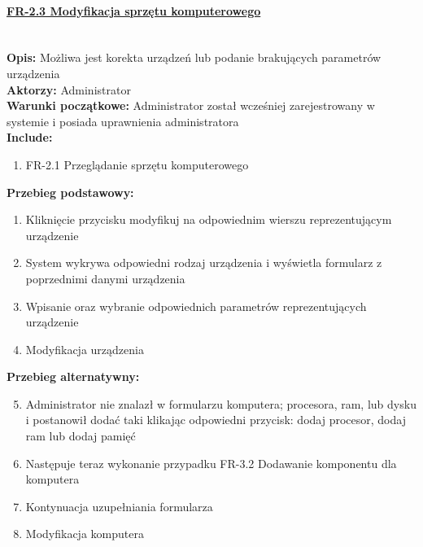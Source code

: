 \paragraph{\underline{FR-2.3 Modyfikacja sprzętu komputerowego}}\mbox{}\\[1mm]
	\noindent\textbf{Opis:} Możliwa jest korekta urządzeń lub podanie brakujących parametrów urządzenia\\
	\noindent\textbf{Aktorzy:} Administrator\\
	\textbf{Warunki początkowe:} Administrator został wcześniej zarejestrowany w systemie i posiada uprawnienia administratora\\
	\textbf{Include:} 
	\begin{enumerate}[noparskip]
		\item FR-2.1 Przeglądanie sprzętu komputerowego
	\end{enumerate}
	\textbf{Przebieg podstawowy:}
	\begin{enumerate}[noparskip]
    \item Kliknięcie przycisku modyfikuj na odpowiednim wierszu reprezentującym urządzenie
	  \item System wykrywa odpowiedni rodzaj urządzenia i wyświetla formularz z poprzednimi danymi urządzenia
	  \item Wpisanie oraz wybranie odpowiednich parametrów reprezentujących urządzenie
	  \item Modyfikacja urządzenia
	\end{enumerate} 
	\textbf{Przebieg alternatywny:}
	\begin{enumerate}[noparskip]\setcounter{enumi}{4}
		\item Administrator nie znalazł w formularzu komputera; procesora, ram, lub dysku i postanowił dodać taki klikając odpowiedni przycisk: dodaj procesor, dodaj ram lub dodaj pamięć
		\item Następuje teraz wykonanie przypadku FR-3.2 Dodawanie komponentu dla komputera
		\item Kontynuacja uzupełniania formularza
		\item Modyfikacja komputera
	\end{enumerate} \mbox{}\\[-11mm]
	
